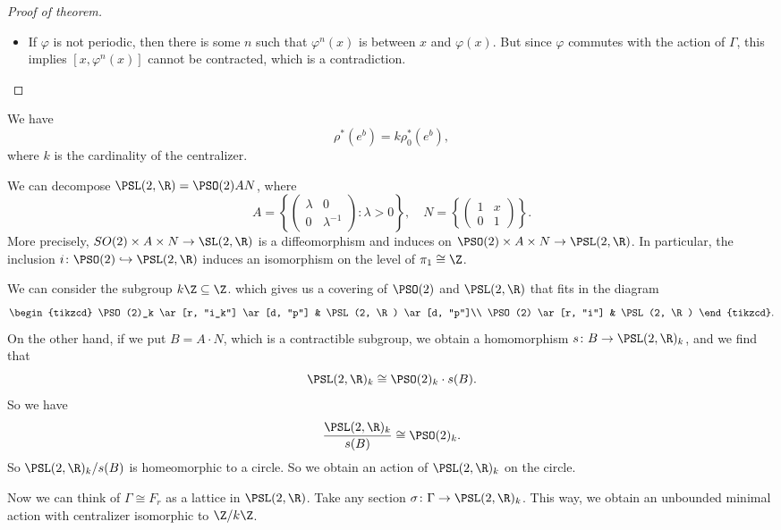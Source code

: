 \documentclass[a4paper]{article}
\newcommand\Free{F}
\begin{document}
\begin{proof}[Proof of theorem]
\begin{itemize}
    \item If $\varphi$ is not periodic, then there is some $n$ such that $\varphi^n(x)$ is between $x$ and $\varphi(x)$. But since $\varphi$ commutes with the action of $\Gamma$, this implies $[x, \varphi^n(x)]$ cannot be contracted, which is a contradiction.
  \end{itemize}
\end{proof}

\begin{ex}
  We have
  \[
    \rho^*(e^b) = k \rho^*_0(e^b),
  \]
  where $k$ is the cardinality of the centralizer.
\end{ex}

\begin{eg}
  We can decompose $\PSL(2, \R) = \PSO(2) AN$, where
  \[
    A = \left\{
      \begin{pmatrix}
        \lambda & 0\\
        0 & \lambda^{-1}
      \end{pmatrix}: \lambda > 0
    \right\},\quad N = \left\{
      \begin{pmatrix}
        1 & x\\
        0 & 1
      \end{pmatrix}
    \right\}.
  \]
  More precisely, $SO(2) \times A \times N \to \SL(2, \R)$ is a diffeomorphism and induces on $\PSO(2)\times A \times N \to \PSL(2, \R)$. In particular, the inclusion $i\colon \PSO(2) \hookrightarrow \PSL(2, \R)$ induces an isomorphism on the level of $\pi_1 \cong \Z$.

  We can consider the subgroup $k\Z \subseteq \Z$. which gives us a covering of $\PSO(2)$ and $\PSL(2, \R)$ that fits in the diagram
  \[
    \begin{tikzcd}
      \PSO(2)_k \ar[r, "i_k"] \ar[d, "p"] & \PSL(2, \R) \ar[d, "p"]\\
      \PSO(2) \ar[r, "i"] & \PSL(2, \R)
    \end{tikzcd}.
  \]
  On the other hand, if we put $B = A \cdot N$, which is a contractible subgroup, we obtain a homomorphism $s\colon B \to \PSL(2, \R)_k$, and we find that
  \[
    \PSL(2, \R)_k \cong \PSO(2)_k \cdot s(B).
  \]
  So we have
  \[
    \frac{\PSL(2, \R)_k}{ s(B)} \cong \PSO(2)_k.
  \]
  So $\PSL(2, \R)_k/s(B)$ is homeomorphic to a circle. So we obtain an action of $\PSL(2, \R)_k$ on the circle. %

  Now we can think of $\Gamma \cong \Free_r$ as a lattice in $\PSL(2, \R)$. Take any section $\sigma\colon \Gamma \to \PSL(2, \R)_k$. This way, we obtain an unbounded minimal action with centralizer isomorphic to $\Z/k\Z$.
\end{eg}
\end{document}
